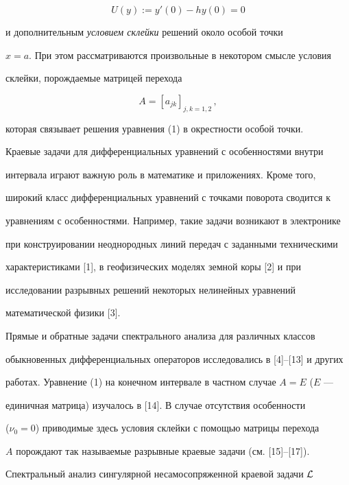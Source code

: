 \begin{equation}


U(y):=y'(0)-hy(0)=0


\end{equation}


и дополнительным {\it условием склейки} решений около особой точки


$x=a$. При этом рассматриваются произвольные в некотором смысле условия


склейки, порождаемые матрицей перехода


$$


A=[a_{jk}]_{j,k=1,2}\,,


$$


которая связывает решения уравнения (1) в окрестности особой точки.


Краевые задачи для дифференциальных уравнений с особенностями внутри


интервала играют важную роль в математике и приложениях. Кроме того,


широкий класс дифференциальных уравнений с точками поворота сводится к


уравнениям с особенностями. Например, такие задачи возникают в электронике


при конструировании неоднородных линий передач с заданными техническими


характеристиками [1], в геофизических моделях земной коры [2] и при


исследовании разрывных решений некоторых нелинейных уравнений


математической физики [3].





Прямые и обратные задачи спектрального анализа для различных классов


обыкновенных дифференциальных операторов исследовались в [4]--[13] и других


работах. Уравнение (1) на конечном интервале в частном случае $A=E$ ($E$ ---


единичная матрица) изучалось в [14]. В случае отсутствия особенности


($\nu_0=0$) приводимые здесь условия склейки с помощью матрицы перехода


$A$ порождают так называемые разрывные краевые задачи (см. [15]--[17]).





Спектральный анализ сингулярной несамосопряженной краевой задачи ${\cal L}$


